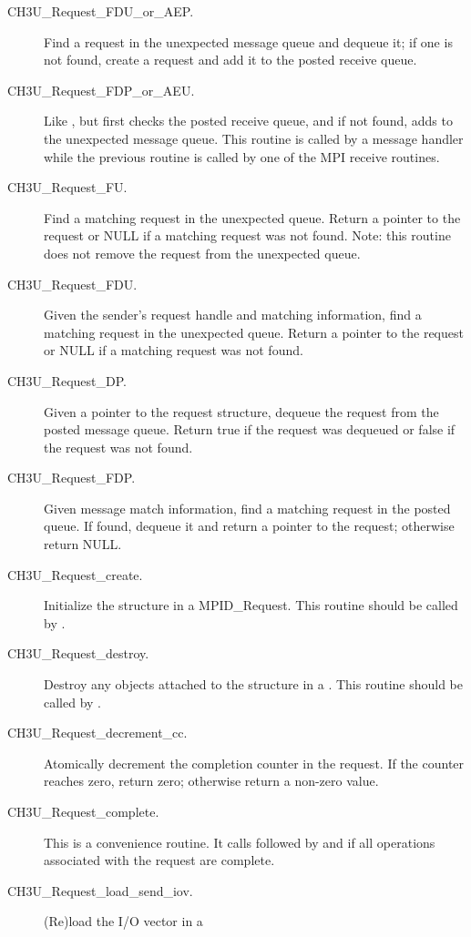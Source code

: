\documentclass{article}
\begin{document}
\begin{description}
\item[CH3U\_Request\_FDU\_or\_AEP.]Find a request in the unexpected
message queue and dequeue it; if one is not found, create a request
and add it to the posted receive queue.
\item[CH3U\_Request\_FDP\_or\_AEU.]Like ,
but first checks the posted receive queue, and if not found, adds to
the unexpected message queue.  This routine is called by a message
handler while the previous routine is called by one of the MPI receive
routines.  
\item[CH3U\_Request\_FU.]Find a matching request in the unexpected
queue.  Return a pointer to the request or NULL if a matching request
was not found.  Note: this routine does not remove the request from
the unexpected queue.
\item[CH3U\_Request\_FDU.]Given the sender's request handle and
matching information, find a matching request in the unexpected queue.
Return a pointer to the request or NULL if a matching request was not
found.
\item[CH3U\_Request\_DP.]Given a pointer to the request structure,
dequeue the request from the posted message queue.  Return true if the
request was dequeued or false if the request was not found.
\item[CH3U\_Request\_FDP.]Given message match information, find a
matching request in the posted queue.  If found, dequeue it and return
a pointer to the request; otherwise return NULL.
\item[CH3U\_Request\_create.]Initialize the  structure in a
MPID\_Request.  This routine should be called by
.
\item[CH3U\_Request\_destroy.]Destroy any objects attached to the
 structure in a .  This routine should be
called by .
\item[CH3U\_Request\_decrement\_cc.]Atomically decrement the
completion counter in the request.  If the counter reaches zero,
return zero; otherwise return a non-zero value.
\item[CH3U\_Request\_complete.]This is a convenience routine.  It
calls  followed by
 and 
if all operations associated with the request are complete.
\item[CH3U\_Request\_load\_send\_iov.](Re)load the I/O vector in a

\end{description}
\end{document}

